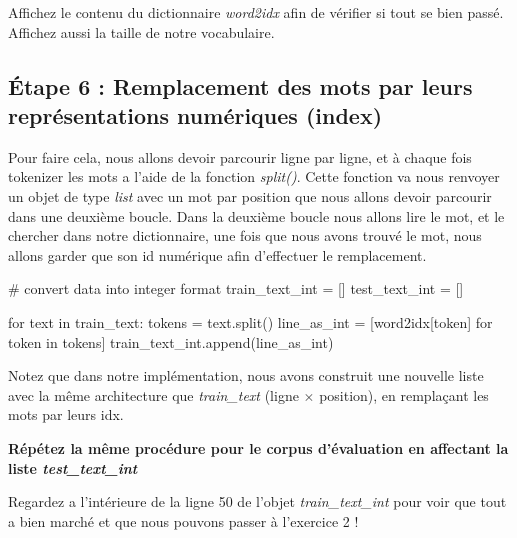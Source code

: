 Affichez le contenu du dictionnaire \textit{word2idx} afin de vérifier si tout se bien passé. Affichez aussi la taille de notre vocabulaire.

\subsection{Étape 6 : Remplacement des mots par leurs représentations numériques (index)}

Pour faire cela, nous allons devoir parcourir ligne par ligne, et à chaque fois tokenizer les mots a l'aide de la fonction \textit{split()}. Cette fonction va nous renvoyer un objet de type \textit{list} avec un mot par position que nous allons devoir parcourir dans une deuxième boucle. Dans la deuxième boucle nous allons lire le mot, et le chercher dans notre dictionnaire, une fois que nous avons trouvé le mot, nous allons garder que son id numérique afin d’effectuer le remplacement.

\begin{python}
# convert data into integer format
train_text_int = []
test_text_int = []

for text in train_text:
 tokens = text.split()
 line_as_int = [word2idx[token] for token in tokens]
 train_text_int.append(line_as_int)

\end{python}


Notez que dans notre implémentation, nous avons construit une nouvelle liste avec la même architecture que \textit{train\_text} (ligne $\times$ position), en remplaçant les mots par leurs idx.

\textbf{
Répétez la même procédure pour le corpus d'évaluation en affectant la liste \textit{test\_text\_int}}

Regardez a l’intérieure de la ligne 50 de l'objet \textit{train\_text\_int} pour voir que tout a bien marché et que nous pouvons passer à l’exercice 2 !